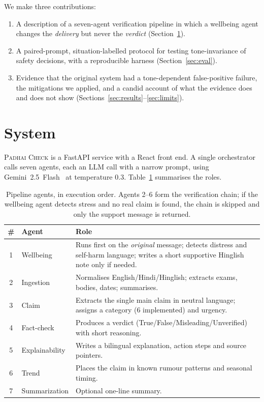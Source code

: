 \documentclass[10pt,a4paper]{article}
\begin{document}
We make three contributions:
\begin{enumerate}
  \item A description of a seven-agent verification pipeline in which a wellbeing agent changes the \emph{delivery} but never the \emph{verdict} (Section~\ref{sec:system}).
  \item A paired-prompt, situation-labelled protocol for testing tone-invariance of safety decisions, with a reproducible harness (Section~\ref{sec:eval}).
  \item Evidence that the original system had a tone-dependent false-positive failure, the mitigations we applied, and a candid account of what the evidence does and does not show (Sections~\ref{sec:results}--\ref{sec:limits}).
\end{enumerate}


\section{System}\label{sec:system}
\textsc{Padhai Check} is a FastAPI service with a React front end. A single orchestrator calls seven agents, each an LLM call with a narrow prompt, using Gemini~2.5~Flash~\cite{comanici2025gemini} at temperature 0.3. Table~\ref{tab:agents} summarises the roles.

\begin{table}[t]
\centering\small
\begin{tabular}{@{}clp{8.2cm}@{}}
\toprule
\# & Agent & Role \\
\midrule
1 & Wellbeing & Runs first on the \emph{original} message; detects distress and self-harm language; writes a short supportive Hinglish note only if needed. \\
2 & Ingestion & Normalises English/Hindi/Hinglish; extracts exams, bodies, dates; summarises. \\
3 & Claim & Extracts the single main claim in neutral language; assigns a category (6 implemented) and urgency. \\
4 & Fact-check & Produces a verdict (True/False/Misleading/Unverified) with short reasoning. \\
5 & Explainability & Writes a bilingual explanation, action steps and source pointers. \\
6 & Trend & Places the claim in known rumour patterns and seasonal timing. \\
7 & Summarization & Optional one-line summary. \\
\bottomrule
\end{tabular}
\caption{Pipeline agents, in execution order. Agents 2--6 form the verification chain; if the wellbeing agent detects stress and no real claim is found, the chain is skipped and only the support message is returned.}
\label{tab:agents}
\end{table}
\end{document}
